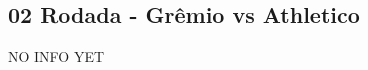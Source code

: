 \newpage
\subsection{02 Rodada - Grêmio vs Athletico}

\begin{figure}[H]
    \centering
    
\end{figure}

NO INFO YET